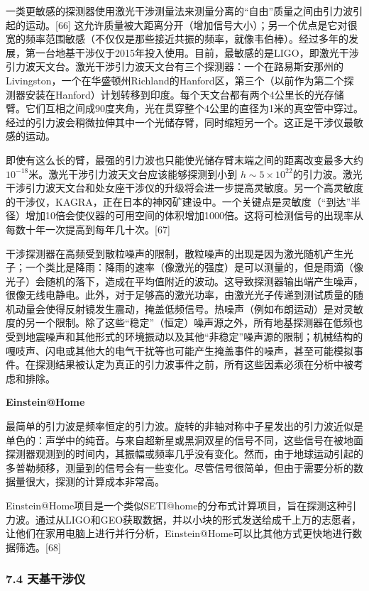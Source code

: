 一类更敏感的探测器使用激光干涉测量法来测量分离的“自由”质量之间由引力波引起的运动。[66] 这允许质量被大距离分开（增加信号大小）；另一个优点是它对很宽的频率范围敏感（不仅仅是那些接近共振的频率，就像韦伯棒）。经过多年的发展，第一台地基干涉仪于2015年投入使用。目前，最敏感的是LIGO，即激光干涉引力波天文台。激光干涉引力波天文台有三个探测器：一个在路易斯安那州的Livingston，一个在华盛顿州Richland的Hanford区，第三个（以前作为第二个探测器安装在Hanford）计划转移到印度。每个天文台都有两个4公里长的光存储臂。它们互相之间成90度夹角，光在贯穿整个4公里的直径为1米的真空管中穿过。经过的引力波会稍微拉伸其中一个光储存臂，同时缩短另一个。这正是干涉仪最敏感的运动。

即使有这么长的臂，最强的引力波也只能使光储存臂末端之间的距离改变最多大约$10^{-18}$米。激光干涉引力波天文台应该能够探测到小到 $h \sim 5 \times 10^{22}$的引力波。激光干涉引力波天文台和处女座干涉仪的升级将会进一步提高灵敏度。另一个高灵敏度的干涉仪，KAGRA，正在日本的神冈矿建设中。一个关键点是灵敏度（“到达”半径）增加10倍会使仪器的可用空间的体积增加1000倍。这将可检测信号的出现率从每数十年一次提高到每年几十次。[67]

干涉探测器在高频受到散粒噪声的限制，散粒噪声的出现是因为激光随机产生光子；一个类比是降雨：降雨的速率（像激光的强度）是可以测量的，但是雨滴（像光子）会随机的落下，造成在平均值附近的波动。这导致探测器输出端产生噪声，很像无线电静电。此外，对于足够高的激光功率，由激光光子传递到测试质量的随机动量会使得反射镜发生震动，掩盖低频信号。热噪声（例如布朗运动）是对灵敏度的另一个限制。除了这些“稳定”（恒定）噪声源之外，所有地基探测器在低频也受到地震噪声和其他形式的环境振动以及其他“非稳定”噪声源的限制；机械结构的嘎吱声、闪电或其他大的电气干扰等也可能产生掩盖事件的噪声，甚至可能模拟事件。在探测结果被认定为真正的引力波事件之前，所有这些因素必须在分析中被考虑和排除。

\textbf{Einstein@Home}

最简单的引力波是频率恒定的引力波。旋转的非轴对称中子星发出的引力波近似是单色的：声学中的纯音。与来自超新星或黑洞双星的信号不同，这些信号在被地面探测器观测到的时间内，其振幅或频率几乎没有变化。然而，由于地球运动引起的多普勒频移，测量到的信号会有一些变化。尽管信号很简单，但由于需要分析的数据量很大，探测的计算成本非常高。

Einstein@Home项目是一个类似SETI@home的分布式计算项目，旨在探测这种引力波。通过从LIGO和GEO获取数据，并以小块的形式发送给成千上万的志愿者，让他们在家用电脑上进行并行分析，Einstein@Home可以比其他方式更快地进行数据筛选。[68]

\subsubsection{7.4 天基干涉仪}

